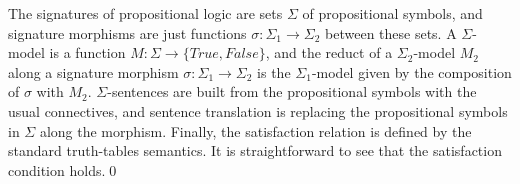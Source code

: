 \documentclass[10pt, a4paper]{isov2}
\begin{document}
\begin{definition}\label{Prop}
The signatures of propositional logic are sets $\Sigma$ of propositional symbols, and signature morphisms are just
functions $\sigma:{\Sigma_1}\to{\Sigma_2}$ between these sets. 
A $\Sigma$-model is a function $M : {\Sigma}\to{\{True, False\}}$, and the reduct of a 
$\Sigma_2$-model $M_2$ along a signature morphism $\sigma:{\Sigma_1}\to{\Sigma_2}$ is 
the $\Sigma_1$-model given by the composition of $\sigma$ with $M_2$. $\Sigma$-sentences are built from the
propositional symbols with the usual connectives, and sentence translation is replacing the propositional
symbols in $\Sigma$ along the morphism. Finally, the satisfaction relation is defined by the standard truth-tables
semantics. It is straightforward to see that the satisfaction condition holds.\quad\qed
\end{definition}
\end{document}
